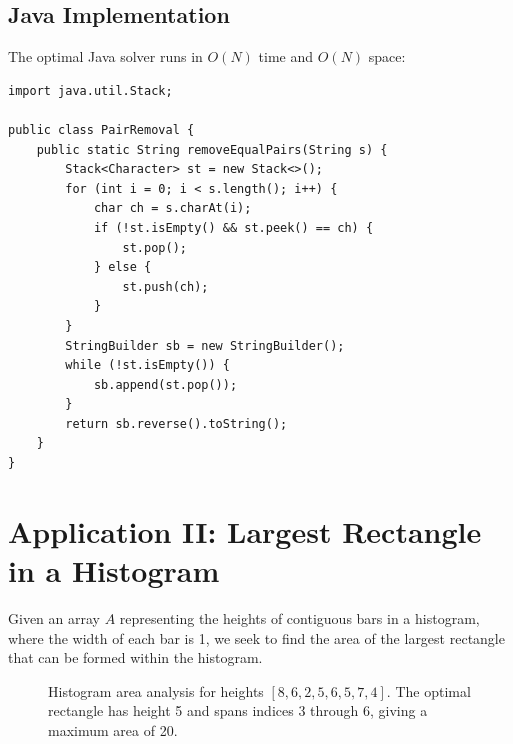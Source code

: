 \documentclass[10pt,journal,compsoc,onecolumn]{IEEEtran}
\begin{document}
\subsection{Java Implementation}
The optimal Java solver runs in $O(N)$ time and $O(N)$ space:
\begin{verbatim}
import java.util.Stack;

public class PairRemoval {
    public static String removeEqualPairs(String s) {
        Stack<Character> st = new Stack<>();
        for (int i = 0; i < s.length(); i++) {
            char ch = s.charAt(i);
            if (!st.isEmpty() && st.peek() == ch) {
                st.pop();
            } else {
                st.push(ch);
            }
        }
        StringBuilder sb = new StringBuilder();
        while (!st.isEmpty()) {
            sb.append(st.pop());
        }
        return sb.reverse().toString();
    }
}
\end{verbatim}

\section{Application II: Largest Rectangle in a Histogram}
\label{sec:histogram}
Given an array $A$ representing the heights of contiguous bars in a histogram, where the width of each bar is 1, we seek to find the area of the largest rectangle that can be formed within the histogram.

\begin{figure}[htbp]
\centering
{}
\caption{Histogram area analysis for heights $[8, 6, 2, 5, 6, 5, 7, 4]$. The optimal rectangle has height 5 and spans indices 3 through 6, giving a maximum area of 20.}
\label{fig:histogram}
\end{figure}
\end{document}
